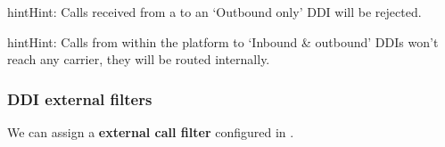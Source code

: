 \documentclass[letterpaper,10pt,english]{sphinxmanual}
\begin{document}
\begin{notice}{hint}{Hint:}
Calls received from a {\hyperref[administration_portal/brand/providers/ddi_providers:ddi\string-providers]{}} to an `Outbound only'
DDI will be rejected.
\end{notice}

\begin{notice}{hint}{Hint:}
Calls from within the platform to `Inbound \& outbound' DDIs won't reach
any carrier, they will be routed internally.
\end{notice}


\subsubsection{DDI external filters}
\label{administration_portal/client/vpbx/ddis:ddi-external-filters}
We can assign a \textbf{external call filter} configured in {\hyperref[administration_portal/client/vpbx/routing_tools/external_call_filters:external\string-call\string-filters]{}}.
\end{document}
